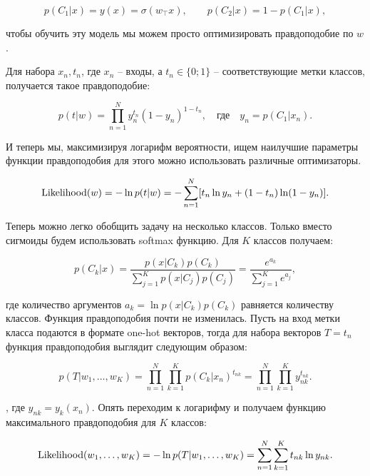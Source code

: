 \begin{equation}
 p(C_1|x) = y(x) = \sigma (w_\top x),\qquad p(C_2|x) = 1-p(C_1|x),
\end{equation}

чтобы обучить эту модель мы можем просто оптимизировать правдоподобие по $w$.

Для набора ${x_n, t_n}$, где $x_n$ -- входы, а $t_n \in \{0;1\}$ -- соответствующие метки классов, получается
такое правдоподобие:

\begin{equation}
 p(t|w) = \prod_{n=1}^N y_n^{t_n}(1-y_n)^{1-t_n},\quad\text{где}\quad y_n = p(C_1|x_n).
\end{equation}

И теперь мы, максимизируя логарифм вероятности, ищем наилучшие параметры функции правдоподобия для этого можно
использовать различные оптимизаторы.

\begin{equation}
 \operatorname*{Likelihood} (w) = -\ln p(t|w) = -\sum_{n=1}^N[t_n \ln y_n + (1-t_n) \ln (1-y_n)].
\end{equation}

Теперь можно легко обобщить задачу на несколько классов. Только вместо сигмоиды будем использовать softmax
функцию. Для $K$ классов получаем:

\begin{equation}
 p(C_k|x) = \frac{p(x|C_k)p(C_k)}{\sum_{j=1}^K p(x|C_j)p(C_j)} = \frac{e^{a_k}}{\sum_{j=1}^K e^{a_j}},
\end{equation}

где количество аргументов $a_k = \ln p(x|C_k)p(C_k)$ равняется количеству классов. Функция правдоподобия почти
не изменилась. Пусть на вход метки класса подаются в формате one-hot векторов, тогда для набора векторов $T =
{t_n}$ функция правдоподобия выглядит следующим образом:

\begin{equation}
 p(T|w_1,\ldots,w_K) = \prod_{n=1}^N \prod_{k=1}^K p(C_k|x_n)^{t_{nk}} = \prod_{n=1}^N \prod_{k=1}^K
y_{nk}^{t_{nk}}.
\end{equation}

, где $y_{nk} = y_k(x_n)$. Опять переходим к логарифму и получаем функцию максимального правдоподобия для $K$
классов:

\begin{equation}
 \operatorname*{Likelihood} (w_1,\ldots,w_K) = -\ln p(T|w_1,\ldots,w_K) = \sum_{n=1}^N \sum_{k=1}^K t_{nk}\ln y_{nk}.
\end{equation}



